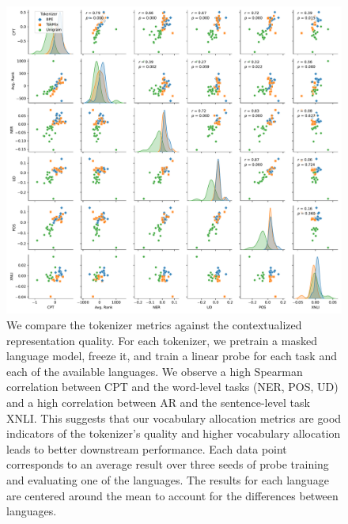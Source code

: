 \begin{figure}
    \centering
    \includegraphics[width=\textwidth]{figures/pair_analysis_20L.pdf}
    \caption{We compare the tokenizer metrics against the contextualized representation quality. For each tokenizer, we pretrain a masked language model, freeze it, and train a linear probe for each task and each of the available languages. We observe a high Spearman correlation between CPT and the word-level tasks (NER, POS, UD) and a high correlation between AR and the sentence-level task XNLI. This suggests that our vocabulary allocation metrics are good indicators of the tokenizer's quality and higher vocabulary allocation leads to better downstream performance. Each data point corresponds to an average result over three seeds of probe training and evaluating one of the languages. The results for each language are centered around the mean to account for the differences between languages.}
    \label{fig:pair_analysis_20L}
\end{figure}


